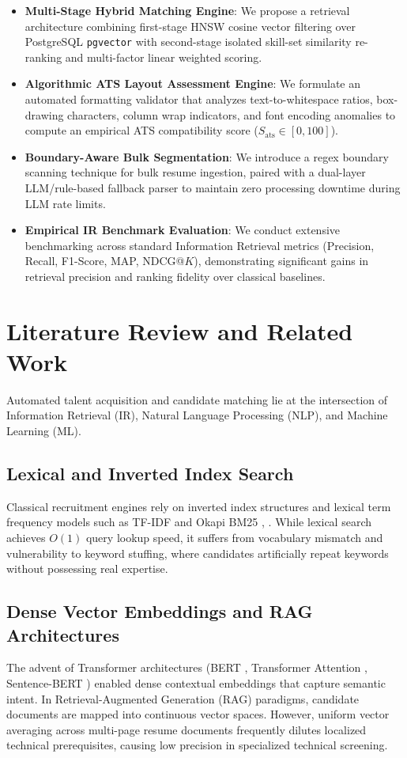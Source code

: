 \documentclass[conference]{IEEEtran}
\begin{document}
\begin{itemize}
    \item \textbf{Multi-Stage Hybrid Matching Engine}: We propose a retrieval architecture combining first-stage HNSW cosine vector filtering over PostgreSQL \texttt{pgvector} with second-stage isolated skill-set similarity re-ranking and multi-factor linear weighted scoring.
    \item \textbf{Algorithmic ATS Layout Assessment Engine}: We formulate an automated formatting validator that analyzes text-to-whitespace ratios, box-drawing characters, column wrap indicators, and font encoding anomalies to compute an empirical ATS compatibility score ($S_{\text{ats}} \in [0, 100]$).
    \item \textbf{Boundary-Aware Bulk Segmentation}: We introduce a regex boundary scanning technique for bulk resume ingestion, paired with a dual-layer LLM/rule-based fallback parser to maintain zero processing downtime during LLM rate limits.
    \item \textbf{Empirical IR Benchmark Evaluation}: We conduct extensive benchmarking across standard Information Retrieval metrics (Precision, Recall, F1-Score, MAP, NDCG@$K$), demonstrating significant gains in retrieval precision and ranking fidelity over classical baselines.
\end{itemize}

\section{Literature Review and Related Work}
Automated talent acquisition and candidate matching lie at the intersection of Information Retrieval (IR), Natural Language Processing (NLP), and Machine Learning (ML).

\subsection{Lexical and Inverted Index Search}
Classical recruitment engines rely on inverted index structures and lexical term frequency models such as TF-IDF and Okapi BM25 \cite{b1}, \cite{b5}. While lexical search achieves $O(1)$ query lookup speed, it suffers from vocabulary mismatch and vulnerability to keyword stuffing, where candidates artificially repeat keywords without possessing real expertise.

\subsection{Dense Vector Embeddings and RAG Architectures}
The advent of Transformer architectures (BERT \cite{b2}, Transformer Attention \cite{b3}, Sentence-BERT \cite{b6}) enabled dense contextual embeddings that capture semantic intent. In Retrieval-Augmented Generation (RAG) paradigms, candidate documents are mapped into continuous vector spaces. However, uniform vector averaging across multi-page resume documents frequently dilutes localized technical prerequisites, causing low precision in specialized technical screening.
\end{document}

